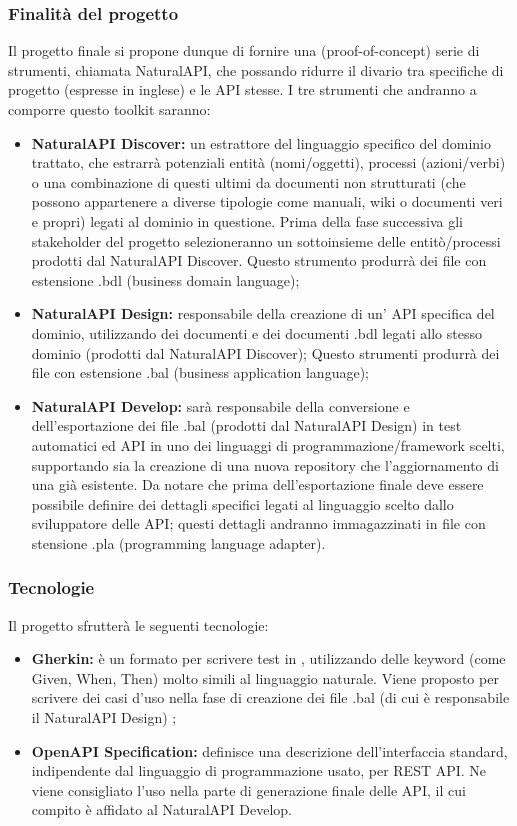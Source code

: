     \subsubsection{Finalità del progetto}
   Il progetto finale si propone dunque di fornire una (proof-of-concept) serie di strumenti,  chiamata NaturalAPI, che possando ridurre il divario tra specifiche di progetto (espresse in inglese) e le API stesse. I tre strumenti che andranno a comporre questo toolkit  saranno:
   \begin{itemize}
   	\item \textbf{NaturalAPI Discover: }un estrattore del linguaggio specifico del dominio trattato, che estrarrà potenziali entità (nomi/oggetti), processi (azioni/verbi) o una combinazione di questi ultimi da documenti non strutturati (che possono appartenere a diverse tipologie come manuali, wiki o documenti veri e propri) legati al dominio in questione. Prima della fase successiva gli stakeholder del progetto selezioneranno un sottoinsieme delle entitò/processi prodotti dal NaturalAPI Discover. Questo strumento produrrà dei file con estensione .bdl (business domain language);
   	
   	\item \textbf{NaturalAPI Design: }responsabile della creazione di un' API specifica del dominio, utilizzando dei documenti  e dei documenti .bdl legati allo stesso dominio (prodotti dal NaturalAPI Discover); Questo strumenti produrrà dei file con estensione .bal (business application language);
   	
   	\item \textbf{NaturalAPI Develop: }sarà responsabile della conversione e dell'esportazione dei file .bal (prodotti dal NaturalAPI Design) in test automatici ed API in uno dei linguaggi di programmazione/framework scelti, supportando sia la creazione di una nuova repository che l'aggiornamento di una già esistente. Da notare che prima dell'esportazione finale deve essere possibile definire dei dettagli specifici legati al linguaggio scelto dallo sviluppatore delle API; questi dettagli andranno immagazzinati in file con stensione .pla (programming language adapter).
   	\end{itemize}
    
    \subsubsection{Tecnologie}
     	Il progetto sfrutterà le seguenti tecnologie:
     	\begin{itemize}
     		\item \textbf{Gherkin: }è un formato per scrivere test in , utilizzando delle keyword (come Given, When, Then) molto simili al linguaggio naturale. Viene proposto per scrivere dei casi d'uso nella fase di creazione dei file .bal (di cui è responsabile il NaturalAPI Design) ;
     		\item \textbf{OpenAPI Specification: }definisce una descrizione dell'interfaccia standard, indipendente dal linguaggio di programmazione usato, per REST API. Ne viene consigliato l'uso nella parte di generazione finale delle API, il cui compito è affidato al NaturalAPI Develop.
     	\end{itemize}
